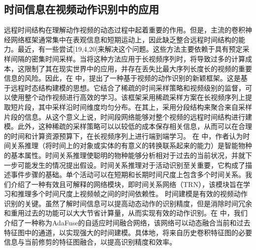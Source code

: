 \subsection{时间信息在视频动作识别中的应用}
远程时间结构在理解动作视频的动态过程中起着重要的作用。但是，主流的卷积神经网络框架通常集中在表观信息和短期运动上，因此缺乏整合远程时间结构的能力。最近，有一些尝试[19,4,20]来解决这个问题。这些方法主要依赖于具有预定采样间隔的密集时间采样。当将这种方法应用于长视频序列时，将导致过多的计算成本，这限制了其在现实世界中的应用，并存在丢失比最大序列长度长的视频的重要信息的风险。因此，在 \cite{TSN} 中，提出了一种基于视频的动作识别的新颖框架。这是基于远程时态结构建模的思想。它结合了稀疏的时间采样策略和视频级别的监督，可以使用整个动作视频进行高效的学习。该框架采用稀疏采样方案在长视频序列上提取短片段，其中采样沿时间维度均匀分布。在其上，采用分段结构来聚合来自采样片段的信息。从这个意义上说，时间段网络能够对整个视频的远程时间结构进行建模。此外，这种稀疏的采样策略可以以较低的成本保存相关信息，从而可以在合理的时间和计算资源预算下，在长视频序列上进行端到端学习。%
在 \cite{TRN} 中，作者认为时间关系推理（将时间上的对象或实体的有意义的转换联系起来的能力）是智能物种的基本属性。时间关系推理使聪明的物种能够分析相对于过去的当前状况，并就下一步可能发生的情况提出假设。时间关系推理对于活动识别至关重要，它构成了描述事件步骤的基础。单个活动可以在短期和长期时间尺度上包含多个时间关系。我们介绍了一种有效且可解释的网络模块，即时间关系网络（TRN），该模块旨在学习和推理多个时间尺度上视频帧之间的时间依赖性。%
时间建模是有效的视频动作识别的关键。虽然了解时间信息可以提高动态动作的识别精度，但是消除时间冗余和重用过去的功能可以大大节省计算量，从而实现有效的动作识别。在 \cite{AdaFuse} 中，我们介绍了一种称为AdaFuse的自适应时间融合网络，该网络可以动态融合当前和过去特征图中的通道，以实现强大的时间建模。具体地，将来自历史卷积特征图的必要信息与当前修剪的特征图融合，以提高识别精度和效率。%
